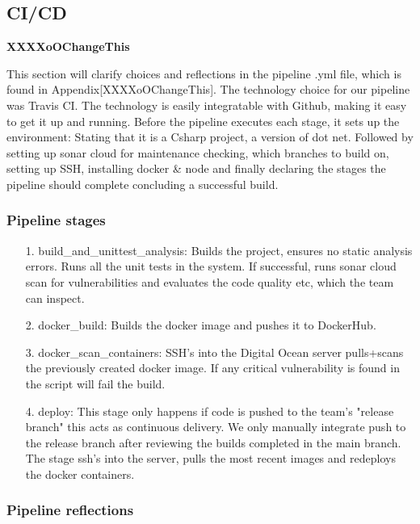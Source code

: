 \subsection{CI/CD}
\label{cicd:label}

{\color{red} \textbf{XXXXoOChangeThis}}

This section will clarify choices and reflections in the pipeline .yml file, which is found in Appendix[XXXXoOChangeThis]. The technology choice for our pipeline was Travis CI. The technology is easily integratable with Github, making it easy to get it up and running. Before the pipeline executes each stage, it sets up the environment: Stating that it is a Csharp project, a version of dot net. Followed by setting up sonar cloud for maintenance checking, which branches to build on, setting up SSH, installing docker \& node and finally declaring the stages the pipeline should complete concluding a successful build.

\subsubsection*{Pipeline stages}

\begin{enumerate}
  \item[1.] build\_and\_unittest\_analysis: Builds the project, ensures no static analysis errors. Runs all the unit tests in the system. If successful, runs sonar cloud scan for vulnerabilities and evaluates the code quality etc, which the team can inspect.
  \item[2.] docker\_build: Builds the docker image and pushes it to DockerHub.
  \item[3.] docker\_scan\_containers: SSH's into the Digital Ocean server pulls+scans the previously created docker image. If any critical vulnerability is found in the script will fail the build.
  \item[4.] deploy: This stage only happens if code is pushed to the team's "release branch" this acts as continuous delivery. We only manually integrate push to the release branch after reviewing the builds completed in the main branch. The stage ssh's into the server, pulls the most recent images and redeploys the docker containers.
\end{enumerate}

\subsubsection*{Pipeline reflections}

